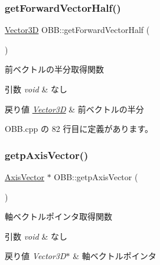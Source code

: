 \subsubsection{\texorpdfstring{get\+Forward\+Vector\+Half()}{getForwardVectorHalf()}}
{\footnotesize\ttfamily \mbox{\hyperlink{class_vector3_d}{Vector3D}} O\+B\+B\+::get\+Forward\+Vector\+Half (\begin{DoxyParamCaption}{ }\end{DoxyParamCaption})}



前ベクトルの半分取得関数 


\begin{DoxyParams}{引数}
{\em void} & なし \\
\hline
\end{DoxyParams}

\begin{DoxyRetVals}{戻り値}
{\em \mbox{\hyperlink{class_vector3_d}{Vector3D}}} & 前ベクトルの半分 \\
\hline
\end{DoxyRetVals}


 O\+B\+B.\+cpp の 82 行目に定義があります。

\mbox{\label{class_o_b_b_a19f4a5e3a412d748cc49f47e1f66faab}} 
\subsubsection{\texorpdfstring{getp\+Axis\+Vector()}{getpAxisVector()}}
{\footnotesize\ttfamily \mbox{\hyperlink{class_axis_vector}{Axis\+Vector}} $\ast$ O\+B\+B\+::getp\+Axis\+Vector (\begin{DoxyParamCaption}{ }\end{DoxyParamCaption})}



軸ベクトルポインタ取得関数 


\begin{DoxyParams}{引数}
{\em void} & なし \\
\hline
\end{DoxyParams}

\begin{DoxyRetVals}{戻り値}
{\em Vector3\+D$\ast$} & 軸ベクトルポインタ \\
\hline
\end{DoxyRetVals}


